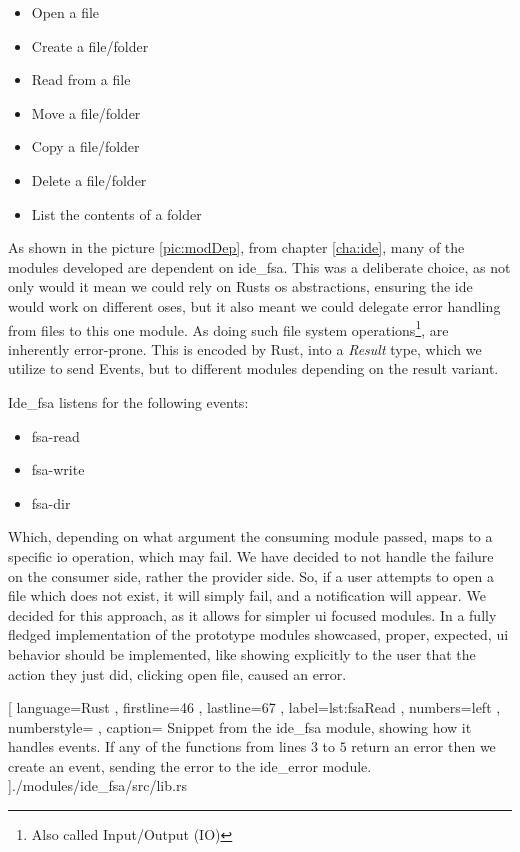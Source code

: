 \begin{itemize}
  \item Open a file
  \item Create a file/folder
  \item Read from a file
  \item Move a file/folder
  \item Copy a file/folder
  \item Delete a file/folder
  \item List the contents of a folder
\end{itemize}

As shown in the picture \ref{pic:modDep}, from chapter \ref{cha:ide}, many of
the modules developed are dependent on ide\_fsa. This was a deliberate
choice, as not only would it mean we could rely on Rusts \gls*{os} abstractions,
ensuring the \gls*{ide} would work on different \gls*{os}es, but it also meant
we could delegate error handling from files to this one module. As doing such
file system operations\footnote{Also called Input/Output (IO)}, are inherently
error-prone. This is encoded by Rust, into a \textit{Result} type, which we
utilize to send Events, but to different modules depending on the result
variant.

Ide\_fsa listens for the following events:

\begin{itemize}
  \item fsa-read
  \item fsa-write
  \item fsa-dir
\end{itemize}

Which, depending on what argument the consuming module passed, maps to a
specific \gls*{io} operation, which may fail. We have decided to not handle the
failure on the consumer side, rather the provider side. So, if a user attempts
to open a file which does not exist, it will simply fail, and a notification
will appear. We decided for this approach, as it allows for simpler \gls*{ui}
focused modules. In a fully fledged implementation of the prototype modules
showcased, proper, expected, \gls*{ui} behavior should be implemented, like
showing explicitly to the user that the action they just did, clicking open
file, caused an error.

\begin{code}[H]
  
    [ language=Rust
    , firstline=46
    , lastline=67
    , label=lst:fsaRead
    , numbers=left
    , numberstyle=\tiny\color{gray}
    , caption={
      Snippet from the ide\_fsa module, showing how it handles events. If any of
      the functions from lines $3$ to $5$ return an error then we create an event,
      sending the error to the ide\_error module.
    }
    ]{./modules/ide\_fsa/src/lib.rs}
\end{code}

